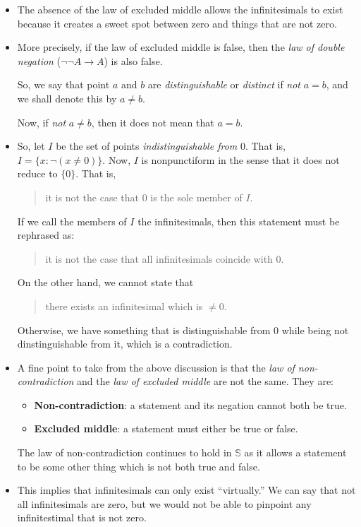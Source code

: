 \documentclass[10pt]{article}
\newcommand{\ra}{\rightarrow}
\begin{document}
\begin{itemize}
  	 \item The absence of the law of excluded middle allows the infinitesimals to exist because it creates a sweet spot between zero and things that are not zero.

  	 \item More precisely, if the law of excluded middle is false, then the \emph{law of double negation} ($\neg \neg A \ra A$) is also false.

  	 So, we say that point $a$ and $b$ are \emph{distinguishable} or \emph{distinct} if \emph{not} $a = b$, and we shall denote this by $a \neq b$.

  	 Now, if \emph{not} $a \neq b$, then it does not mean that $a = b$.

  	 \item So, let $I$ be the set of points \emph{indistinguishable from} $0$. That is, $I = \{ x : \neg(x \neq 0) \}$. Now, $I$ is nonpunctiform in the sense that it does not reduce to $\{0\}$. That is,
  	 \begin{quote}
  	 	it is not the case that $0$ is the sole member of $I$.
  	 \end{quote}
  	 If we call the members of $I$ the infinitesimals, then this statement must be rephrased as:
  	 \begin{quote}
  	 	it is not the case that all infinitesimals coincide with $0$.
  	 \end{quote}
  	 On the other hand, we cannot state that
  	 \begin{quote}
  	 	there exists an infinitesimal which is $\neq 0$.
  	 \end{quote}
  	 Otherwise, we have something that is distinguishable from $0$ while being not dinstinguishable from it, which is a contradiction.

  	 \item A fine point to take from the above discussion is that the \emph{law of non-contradiction} and the \emph{law of excluded middle} are not the same. They are:
  	 \begin{itemize}
  	 	\item {\bf Non-contradiction}: a statement and its negation cannot both be true.
  	 	\item {\bf Excluded middle}: a statement must either be true or false.
  	 \end{itemize}
  	 The law of non-contradiction continues to hold in $\mathbb{S}$ as it allows a statement to be some other thing which is not both true and false.

  	 \item This implies that infinitesimals can only exist ``virtually.'' We can say that not all infinitesimals are zero, but we would not be able to pinpoint any infinitestimal that is not zero.
  \end{itemize}
   
\end{document}
